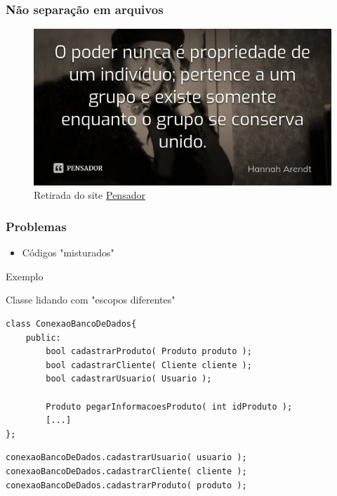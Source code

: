 \begin{frame}
	\frametitle{Não separação em arquivos}

	\begin{figure}[h]
		\centering
			\includegraphics[height=0.6\paperheight]{figuras/hannah}
		\caption{Retirada do site \href{https://www.pensador.com/frase/MTE4NTA3Ng/}{Pensador}}\label{figure:hannah}
	\end{figure}

\end{frame}

\begin{frame}
	\frametitle{Problemas}

	\begin{itemize}
		\item Códigos "misturados"
	\end{itemize}

\end{frame}

\begin{frame}

	\Huge Exemplo

\end{frame}

\begin{frame}[fragile]

	\begin{listing}[H]
		\caption{Classe lidando com "escopos diferentes"}
		\begin{verbatim}
class ConexaoBancoDeDados{
	public:
		bool cadastrarProduto( Produto produto );
		bool cadastrarCliente( Cliente cliente );
		bool cadastrarUsuario( Usuario );

		Produto pegarInformacoesProduto( int idProduto );
		[...]
};
		\end{verbatim}
	\end{listing}

	\begin{listing}[H]
		\begin{verbatim}
conexaoBancoDeDados.cadastrarUsuario( usuario );
conexaoBancoDeDados.cadastrarCliente( cliente );
conexaoBancoDeDados.cadastrarProduto( produto );
		\end{verbatim}
	\end{listing}

\end{frame}

